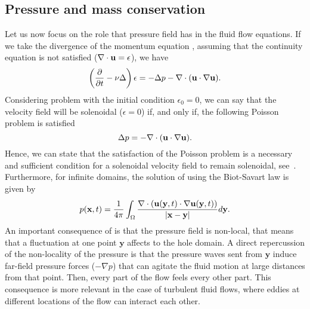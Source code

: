 \subsection{Pressure and mass conservation}
\label{subsec-pressure_mass_conservation}
Let us now focus on the role that pressure field has in the fluid flow equations. If we take the divergence of the momentum equation , assuming that the continuity equation  is not satisfied ($\nabla\cdot{\bf u}=\epsilon$), we have
\begin{equation}
\label{eq-NS_div_momentum}
\left(\frac{\partial}{\partial t}-\nu\Delta\right)\epsilon=-\Delta p-\nabla\cdot({\bf u}\cdot\nabla{\bf u}).
\end{equation}
Considering problem  with the initial condition $\epsilon_0=0$, we can say that the velocity field will be solenoidal ($\epsilon=0$) if, and only if, the following Poisson problem is satisfied
\begin{equation}
\label{eq-NS_poisson}
\Delta p=-\nabla\cdot({\bf u}\cdot\nabla{\bf u}).
\end{equation}
Hence, we can state that the satisfaction of the Poisson problem  is a necessary and sufficient condition for a solenoidal velocity field to remain solenoidal, see~\cite{pope_turbulent_2000}. Furthermore, for infinite domains, the solution of  using the Biot-Savart law is given by 
\begin{equation}
\label{eq-NS_poisson_solution}
p({\bf x},t)=\frac{1}{4\pi}\int_\Omega\frac{\nabla\cdot({\bf u}(\mathbf{y},t)\cdot\nabla{\bf u}(\mathbf{y},t))}{|{\bf x}-\mathbf{y}|}d\mathbf{y}.
\end{equation}
An important consequence of  is that the pressure field is non-local, that means that a fluctuation at one point $\mathbf{y}$ affects to the hole domain. A direct repercussion of the non-locality of the pressure is that the pressure waves sent from $\mathbf{y}$ induce far-field pressure forces ($-\nabla p$) that can agitate the fluid motion at large distances from that point. Then, every part of the flow feels every other part. This consequence is more relevant in the case of turbulent fluid flows, where eddies at different locations of the flow can interact each other. 
